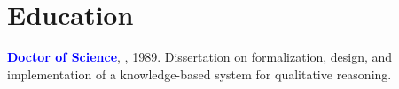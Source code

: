 \documentclass[article, a4paper, 11pt, twoside, openright, english]{memoir}
\begin{document}




\vspace{-5mm} 
\section*{Education}
\noindent \textcolor{blue}{\textbf{Doctor of Science}}, , 1989.
Dissertation on formalization, design, and implementation of a knowledge-based system for qualitative reasoning.
\end{document}
